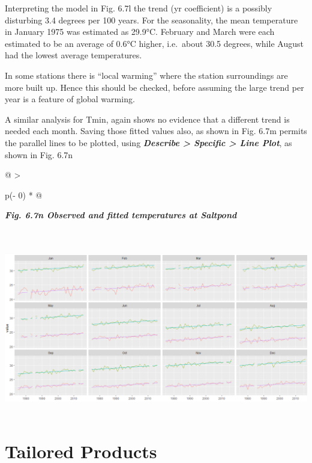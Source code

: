 \documentclass[
  letterpaper,
  DIV=11,
  numbers=noendperiod]{scrreprt}
\begin{document}
Interpreting the model in Fig. 6.7l the trend (yr coefficient) is a
possibly disturbing 3.4 degrees per 100 years. For the seasonality, the
mean temperature in January 1975 was estimated as 29.9°C. February and
March were each estimated to be an average of 0.6°C higher, i.e.~about
30.5 degrees, while August had the lowest average temperatures.

In some stations there is ``local warming'' where the station
surroundings are more built up. Hence this should be checked, before
assuming the large trend per year is a feature of global warming.

A similar analysis for Tmin, again shows no evidence that a different
trend is needed each month. Saving those fitted values also, as shown in
Fig. 6.7m permits the parallel lines to be plotted, using
\textbf{\emph{Describe \textgreater{} Specific \textgreater{} Line
Plot}}, as shown in Fig. 6.7n

\begin{longtable}[]{@{}
  >{\raggedright\arraybackslash}p{(\columnwidth - 0\tabcolsep) * }@{}}
\toprule\noalign{}
\begin{minipage}[b]{\linewidth}\raggedright
\textbf{\emph{Fig. 6.7n Observed and fitted temperatures at Saltpond}}
\end{minipage} \\
\midrule\noalign{}
\endhead
\bottomrule\noalign{}
\endlastfoot
\includegraphics[width=6.0614in,height=2.97294in]{figures/Fig6.7n.png} \\
\end{longtable}


\chapter{Tailored Products}\label{tailored-products}
\end{document}
